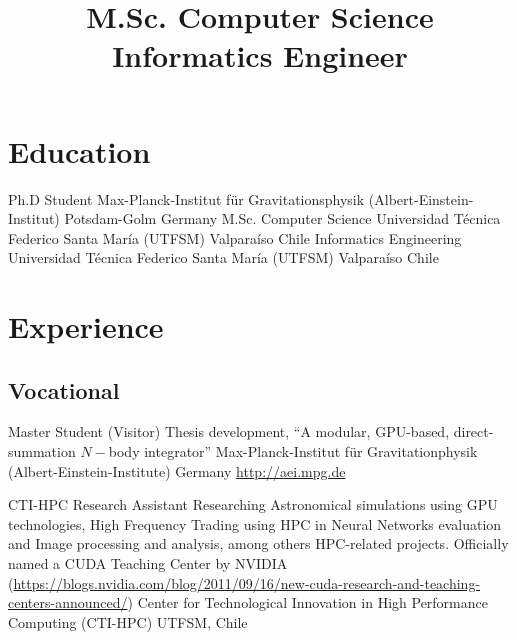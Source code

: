 \documentclass[12pt,a4paper]{moderncv}
\title{\Large M.Sc. Computer Science\newline
Informatics Engineer}
\newcommand{\utfsm}{Universidad Técnica Federico Santa María (UTFSM)}
\begin{document}
\maketitle

\vspace{-1cm}
\section{\LARGE Education}

\cventry{\textcolor{color1}{2013 to present}}
        {Ph.D Student}
        {Max-Planck-Institut für Gravitationsphysik (Albert-Einstein-Institut)}
        {}
        {Potsdam-Golm}
        {Germany}
        {M.Sc. Computer Science}
        {{\utfsm}}
        {}
        {Valparaíso}
        {Chile}
        {Informatics Engineering}
        {{\utfsm}}
        {}
        {Valparaíso}
        {Chile}


\section{\LARGE Experience}
\subsection{\Large Vocational}
\vspace{0.3cm}

        {Master Student (Visitor)}
        {Thesis development, %
        ``A modular, GPU-based, direct-summation $N-$body integrator'' }
        {Max-Planck-Institut für Gravitationphysik (Albert-Einstein-Institute)}
        {Germany}
        {\url{http://aei.mpg.de}}

        {CTI-HPC Research Assistant}
        {Researching %
         Astronomical simulations using GPU technologies, %
         High Frequency Trading using HPC in Neural Networks evaluation %
         and Image processing and analysis, among others HPC-related projects.
         Officially named a CUDA Teaching Center by NVIDIA
         (\url{https://blogs.nvidia.com/blog/2011/09/16/new-cuda-research-and-teaching-centers-announced/})
         }
        {Center for Technological Innovation in High Performance Computing (CTI-HPC)}
        {UTFSM, Chile}
        {}
\end{document}
